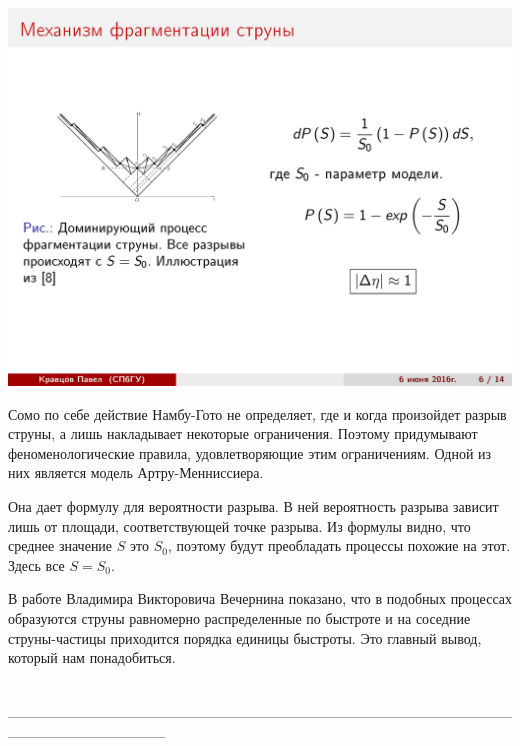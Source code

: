 \documentclass[14pt]{article}
\renewcommand{\line}{\\ \_\_\_\_\_\_\_\_\_\_\_\_\_\_\_\_\_\_\_\_\_\_\_\_\_\_\_\_\_\_\_\_\_\_\_\_\_\_\_\_\_\_\_\_\_\_\_\_\_\_\_\_\_\_\_\_\_\_\_\_\_\_\_ \\ }
\begin{document}
\begin{minipage}[h]{0.35\linewidth}
\includegraphics[width=1\linewidth]{page-06.jpg}
\end{minipage}
\begin{minipage}[h]{0.60\linewidth}
Сомо по себе действие Намбу-Гото не определяет, где и когда произойдет разрыв струны, а лишь накладывает некоторые ограничения. Поэтому придумывают феноменологические правила, удовлетворяющие этим ограничениям. Одной из них является модель Артру-Менниссиера.
 
Она дает формулу для вероятности разрыва. В ней вероятность разрыва зависит лишь от площади, соответствующей точке разрыва. Из формулы видно, что среднее значение $S$ это $S_0$, поэтому будут преобладать процессы похожие на этот. Здесь все $S = S_0$. 

В работе Владимира Викторовича Вечернина показано, что в подобных процессах образуются струны равномерно распределенные по быстроте и на соседние струны-частицы приходится порядка единицы быстроты. Это главный вывод, который нам понадобиться.
\end{minipage}
\line

\newpage
$$$$
$$$$
$$$$
$$$$
\end{document}
